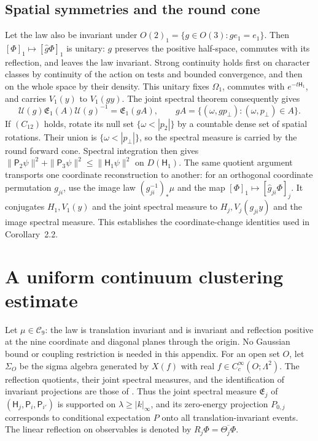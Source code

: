 \documentclass[11pt,letterpaper,reqno]{amsart}
\theoremstyle{definition}
\begin{document}
\subsection{Spatial symmetries and the round cone}
\label{qcm:round-cone}

Let the law also be invariant under $O(2)_1=\{g\in O(3):ge_1=e_1\}$.
Then $[\Phi]_1\mapsto[\hat g\Phi]_1$ is unitary: $g$ preserves the
positive half-space, commutes with its reflection, and leaves the law
invariant. Strong continuity holds first on character classes by
continuity of the action on tests and bounded convergence, and then
on the whole space by their density. This unitary fixes $\Omega_1$,
commutes with $e^{-t\mathsf H_1}$, and carries $V_1(y)$ to $V_1(gy)$.
The joint spectral theorem consequently gives
\[
 \mathcal U(g)\mathfrak E_1(A)\mathcal U(g)^{-1}
      =\mathfrak E_1(gA),\qquad gA=\{(\omega,gp_\perp):
                                      (\omega,p_\perp)\in A\}.
\]
If $(C_{12})$ holds, rotate its null set
$\{\omega<|p_2|\}$ by a countable dense set of spatial rotations.
Their union is $\{\omega<|p_\perp|\}$, so the spectral measure is
carried by the round forward cone. Spectral integration then gives
$\|\mathsf P_2\psi\|^2+\|\mathsf P_3\psi\|^2
\le\|\mathsf H_1\psi\|^2$ on $D(\mathsf H_1)$.
The same quotient argument transports one coordinate reconstruction
to another: for an orthogonal coordinate permutation $g_{ji}$,
use the image law $(g_{ji}^{-1})_*\mu$ and the map
$[\Phi]_1\mapsto[\hat g_{ji}\Phi]_j$.
It conjugates $H_1,V_1(y)$ and the joint spectral measure to
$H_j,V_j(g_{ji}y)$ and the image spectral measure. This establishes
the coordinate-change identities used in Corollary~2.2.

\section{A uniform continuum clustering estimate}
\label{app:continuum-clustering}

Let $\mu\in\mathcal C_9$: the law is translation invariant and is
invariant and reflection positive at the nine coordinate and diagonal
planes through the origin. No Gaussian bound or coupling restriction is
needed in this appendix. For an open set $O$, let $\Sigma_O$ be the
sigma algebra generated by $X(f)$ with real
$f\in C_c^\infty(O;\Lambda^2)$.
The reflection quotients, their joint spectral measures, and the
identification of invariant projections are those of
\cite[Propositions~7.1--7.2 and Section~7.3]{QEDConstruction}.
Thus the joint spectral measure $\mathfrak E_j$ of
$(\mathsf H_j,\mathsf P_{i},\mathsf P_{i'})$ is supported on
$\lambda\ge|k|_\infty$, and its zero-energy projection $P_{0,j}$
corresponds to conditional expectation $P$ onto all translation-invariant
events. The linear reflection on observables is denoted by
$R_j\Phi=\overline{\Theta_j\Phi}$.
\end{document}
